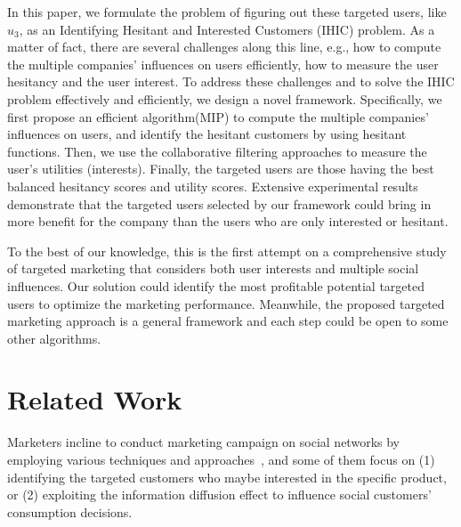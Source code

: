 \documentclass{llncs}
\begin{document}
In this paper, we formulate the problem of figuring out these targeted users, like $u_3$, as an Identifying Hesitant and Interested Customers (IHIC) problem. As a matter of fact, there are several challenges along this line, e.g., how to compute the multiple companies' influences on users efficiently,  how to measure the user hesitancy and the user interest. To address these challenges and to solve the IHIC problem effectively and efficiently, we design a novel framework. Specifically, we first propose an efficient algorithm(MIP) to compute the multiple companies' influences  on users, and  identify the hesitant customers by using hesitant functions. Then, we use the collaborative filtering approaches to measure the user's utilities (interests). Finally, the targeted users are those having the best balanced hesitancy scores and utility scores. Extensive experimental results demonstrate that the targeted users selected by our framework could bring in more benefit for the company than the users who are only interested or hesitant.


To the best of our knowledge, this is the first attempt on a comprehensive study of targeted marketing that considers both user interests and multiple social influences. Our solution could identify the most profitable
potential targeted users to optimize the marketing performance. Meanwhile, the
proposed targeted marketing approach is a general framework and each step could be open to some other algorithms. 



\vspace*{-0.4cm}
\section{Related Work}
\vspace*{-0.4cm}

Marketers incline to conduct marketing campaign on social networks by employing various techniques and approaches~\cite{hartline2008optimal}, and some of them focus on (1) identifying the targeted customers who maybe interested in the specific product, or (2) exploiting the information diffusion effect to influence social customers' consumption decisions.
\end{document}
